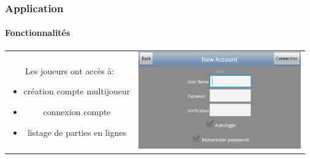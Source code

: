 \begin{frame}
\frametitle{Application}
\framesubtitle{Fonctionnalités}

	\begin{center}
		\begin{tabular}{cc}
			\begin{minipage}{4cm}
				Les joueurs ont accès à:
				\begin{itemize}
				  \item création compte multijoueur
				  \item connexion compte
				  \item listage de parties en lignes
				\end{itemize}
				\end{minipage}&		
				
			\begin{minipage}{8cm}
				\includegraphics[width=7cm]{img/3.png} 
			\end{minipage}\\
			
			
			\end{tabular}
	\end{center}
	

\end{frame}

